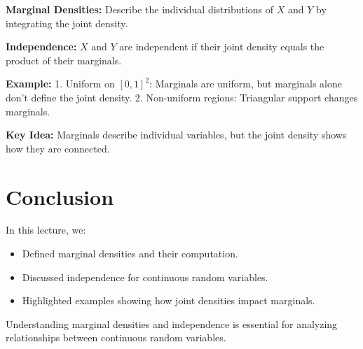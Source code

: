 \documentclass{article}
\begin{document}
\textbf{Marginal Densities:}
Describe the individual distributions of $X$ and $Y$ by integrating the joint density.

\textbf{Independence:}
$X$ and $Y$ are independent if their joint density equals the product of their marginals.

\textbf{Example:}
1. Uniform on $[0,1]^2$: Marginals are uniform, but marginals alone don't define the joint density.
2. Non-uniform regions: Triangular support changes marginals.

\textbf{Key Idea:}
Marginals describe individual variables, but the joint density shows how they are connected.

\section*{Conclusion}

In this lecture, we:
\begin{itemize}
  \item Defined marginal densities and their computation.
  \item Discussed independence for continuous random variables.
  \item Highlighted examples showing how joint densities impact marginals.
\end{itemize}

Understanding marginal densities and independence is essential for analyzing relationships between continuous random variables.
\end{document}
